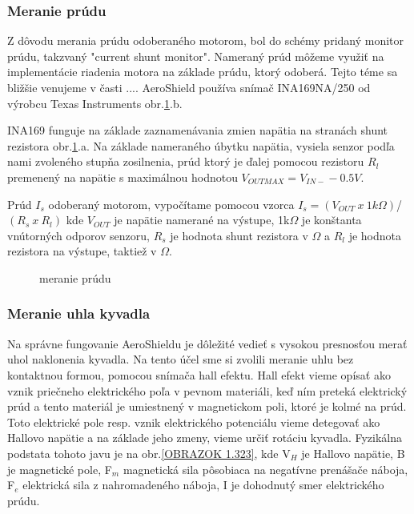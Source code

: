 \subsubsection{Meranie prúdu}
\label{merprud}

Z dôvodu merania prúdu odoberaného motorom, bol do schémy pridaný monitor prúdu, takzvaný "current shunt monitor". Nameraný prúd môžeme využiť na implementácie riadenia motora na základe prúdu, ktorý odoberá. Tejto téme sa bližšie venujeme v časti ....  AeroShield používa snímač INA169NA/250 od výrobcu Texas Instruments obr.\ref{OBRAZOK 2.3.2}.b.

INA169 funguje na základe zaznamenávania zmien napätia na stranách shunt rezistora obr.\ref{OBRAZOK 2.3.2}.a. Na základe nameraného úbytku napätia, vysiela senzor podľa nami zvoleného stupňa zosilnenia, prúd ktorý je ďalej pomocou rezistoru $R_{l}$ premenený na napätie s maximálnou hodnotou $V_{OUTMAX} = V_{IN-} - 0.5V $.

Prúd $I_{s}$ odoberaný motorom, vypočítame pomocou vzorca $I_{s} = {(V_{OUT}\: x \: 1k\Omega)}$/${(R_{s} \: x \: R_{l})}$ kde $V_{OUT}$ je napätie namerané na výstupe, 1k$\Omega$ je konštanta vnútorných odporov senzoru, $R_{s}$ je hodnota shunt rezistora v $\Omega$ a $R_{l}$ je hodnota rezistora na výstupe, taktiež v $\Omega$\cite{INA}.

\begin{figure}[!tbh]
	\hfill
	\hfill
	\hfill
	\caption{meranie prúdu}\label{OBRAZOK 2.3.2}
\end{figure}





\subsubsection{Meranie uhla kyvadla}
\label{meruhl}

Na správne fungovanie AeroShieldu je dôležité vedieť s vysokou presnosťou merať uhol naklonenia kyvadla. Na tento účel sme si zvolili meranie uhlu bez kontaktnou formou, pomocou snímača hall efektu. Hall efekt vieme opísať ako vznik priečneho elektrického poľa v pevnom materiáli, keď ním preteká elektrický prúd a tento materiál je umiestnený v magnetickom poli, ktoré je kolmé na prúd\cite{Hall}. Toto elektrické pole resp. vznik elektrického potenciálu vieme detegovať ako Hallovo napätie a na základe jeho zmeny, vieme určiť rotáciu kyvadla. Fyzikálna podstata tohoto javu je na obr.\ref{OBRAZOK 1.323}, kde V$_H$ je Hallovo napätie, B je magnetické pole, F$_m$ magnetická sila pôsobiaca na negatívne prenášače náboja, F$_e$ elektrická sila z nahromadeného náboja, I je dohodnutý smer elektrického prúdu. 

